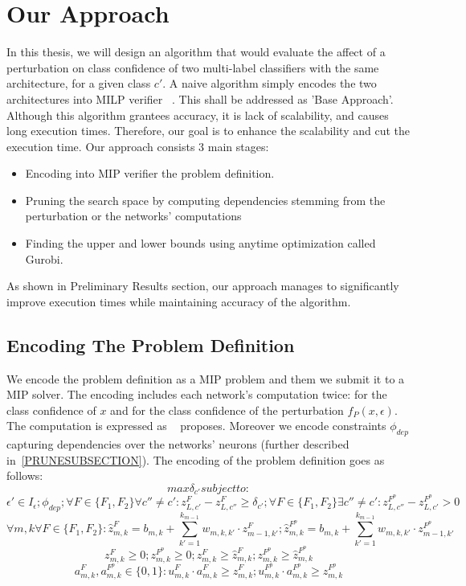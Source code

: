
\section{Our Approach}

In this thesis, we will design an algorithm that would evaluate the affect of a perturbation on class confidence of two multi-label classifiers with the same architecture, for a given class $c'$. A naive algorithm simply encodes the two architectures into MILP verifier ~\cite{MIPVERIFY}. This shall be addressed as 'Base Approach'. Although this algorithm grantees accuracy, it is lack of scalability, and causes long execution times. Therefore, our goal is to enhance the scalability and cut the execution time. Our approach consists 3 main stages:
\begin{itemize}
    \item Encoding into MIP verifier the problem definition.
    \item Pruning the search space by computing dependencies stemming from the perturbation or the networks' computations
    \item Finding the upper and lower bounds using anytime optimization called Gurobi.
\end{itemize}
As shown in Preliminary Results section, our approach manages to significantly improve execution times while maintaining accuracy of the algorithm.

\subsection{Encoding The Problem Definition}
We encode the problem definition as a MIP problem and them we submit it to a MIP solver. The encoding includes each network's computation twice: for the class confidence of $x$ and for the class confidence of the perturbation $f_P(x,\epsilon)$. The computation is expressed as ~\cite{MIPVERIFY} proposes. Moreover we encode constraints $\phi_{dep}$ capturing dependencies over the networks’ neurons (further described in~\ref{PRUNESUBSECTION}).
The encoding of the problem definition goes as follows:
$$max{\delta_{c'}} subject to:$$
$$ \epsilon'\in{I_\epsilon}; \phi_{dep}; \forall{F}\in{\{F_1,F_2\}}\forall{c''}\neq{c'}: z^{F}_{L,c'}-z^{F}_{L,c''}\geq\delta_{c'}; \forall{F}\in{\{F_1,F_2\}}\exists{c''}\neq{c'}: z^{F^p}_{L,c''}-z^{F^p}_{L,c'}>0$$
$$\forall{m,k}\forall{F}\in{\{F_1,F_2\}}: \hat{z}^F_{m,k}=b_{m,k}+\sum_{k'=1}^{k_{m-1}} w_{m,k,k'}\cdot{z^F_{m-1,k'}}; \hat{z}^{F^p}_{m,k}=b_{m,k}+\sum_{k'=1}^{k_{m-1}} w_{m,k,k'}\cdot{z^{F^p}_{m-1,k'}}$$
$$z^F_{m,k}\geq0; z^{F^p}_{m,k}\geq0; z^F_{m,k}\geq{\hat{z}^F_{m,k}}; z^{F^p}_{m,k}\geq{\hat{z}^{F^p}_{m,k}}$$
$$a^F_{m,k},a^{F^p}_{m,k}\in{\{0,1\}}: u^F_{m,k}\cdot{a^F_{m,k}}\geq{z^F_{m,k}}; u^{F^p}_{m,k}\cdot{a^{F^p}_{m,k}}\geq{z^{F^p}_{m,k}}$$



